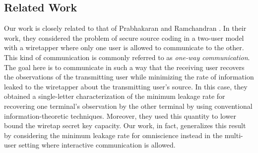 %

\subsection{Related Work}

Our work is closely related to that of Prabhakaran and Ramchandran \cite{vinod07}. In their work, they considered the problem of secure source coding in a two-user model with a wiretapper where only one user is allowed to communicate to the other. This kind of communication is commonly referred to as \emph{one-way communication}. The goal here is to communicate in such a way that the receiving user recovers the observations of the transmitting user while minimizing the rate of information leaked to the wiretapper about the transmitting user's source. In this case, they  obtained a single-letter characterization of the minimum leakage rate for recovering one terminal's observation by the other terminal by using conventional information-theoretic techniques. Moreover, they used this quantity to lower bound the wiretap secret key capacity. Our work, in fact, generalizes this result by considering the minimum leakage rate for omniscience instead in the multi-user setting where interactive communication is allowed.


